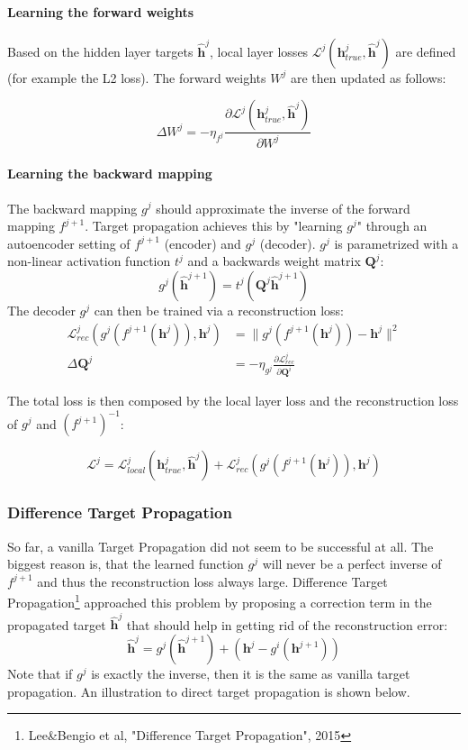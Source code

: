 \documentclass[main]{subfiles}
\begin{document}
\paragraph{Learning the forward weights}
Based on the hidden layer targets $\bm{\hat{h}}^j$, local layer losses $\mathcal{L}^j(\bm{h}_{true}^j, \bm{\hat{h}}^j)$ are defined (for example the L2 loss). The forward weights $W^j$ are then updated as follows:

\begin{equation}
    \Delta W^j = -\eta_{f^j} \frac{\partial \mathcal{L}^j(\bm{h}_{true}^j, \bm{\hat{h}}^j)}{\partial W^j}
\end{equation}

\paragraph{Learning the backward mapping}
The backward mapping $g^j$ should approximate the inverse of the forward mapping $f^{j+1}$. Target propagation achieves this by "learning $g^j$" through an autoencoder setting of $f^{j+1}$ (encoder) and $g^j$ (decoder). $g^j$ is parametrized with a non-linear activation function $t^j$ and a backwards weight matrix $\bm{Q}^j$: 
%
\begin{equation}
    g^j(\bm{\hat{h}}^{j+1}) = t^j(\bm{Q}^j\bm{\hat{h}}^{j+1})
\end{equation}
%
The decoder $g^j$ can then be trained via a reconstruction loss:
%
\begin{align}
    \mathcal{L}_{rec}^j(g^j(f^{j+1}(\bm{h}^j)), \bm{h}^j) &= \| g^j(f^{j+1}(\bm{h}^j)) - \bm{h}^j\|^2\\
    \Delta \bm{Q}^j &= -\eta_{g^j} \frac{\partial \mathcal{L}_{rec}^j}{\partial \bm{Q}^i}
\end{align}

The total loss is then composed by the local layer loss and the reconstruction loss of $g^j$ and $(f^{j+1})^{-1}$:

\begin{equation}
    \mathcal{L}^j = \mathcal{L}_{local}^j(\bm{h}_{true}^j, \bm{\hat{h}}^j) + \mathcal{L}_{rec}^j(g^j(f^{j+1}(\bm{h}^j)), \bm{h}^j)
\end{equation}

\subsubsection{Difference Target Propagation}
So far, a vanilla Target Propagation did not seem to be successful at all. The biggest reason is, that the learned function $g^j$ will never be a perfect inverse of $f^{j+1}$ and thus the reconstruction loss always large. Difference Target Propagation\footnote{Lee\&Bengio et al, "Difference Target Propagation", 2015} approached this problem by proposing a correction term in the propagated target $\bm{\hat{h}}^{j}$ that should help in getting rid of the reconstruction error:
%
\begin{equation}
    \bm{\hat{h}}^{j} = g^j(\bm{\hat{h}}^{j+1}) + (\bm{h}^{j} - g^i(\bm{h}^{j+1}))
\end{equation}
%
Note that if $g^j$ is exactly the inverse, then it is the same as vanilla target propagation. An illustration to direct target propagation is shown below.
\end{document}
